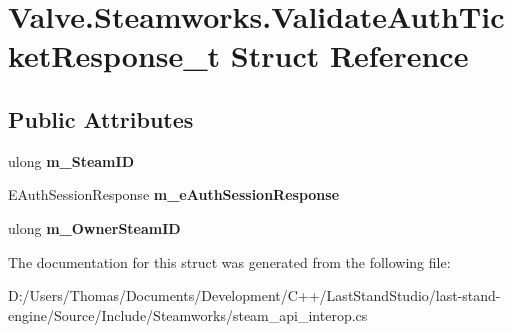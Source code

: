 \hypertarget{structValve_1_1Steamworks_1_1ValidateAuthTicketResponse__t}{}\section{Valve.\+Steamworks.\+Validate\+Auth\+Ticket\+Response\+\_\+t Struct Reference}
\label{structValve_1_1Steamworks_1_1ValidateAuthTicketResponse__t}
\subsection*{Public Attributes}
\begin{DoxyCompactItemize}
\item 
\hypertarget{structValve_1_1Steamworks_1_1ValidateAuthTicketResponse__t_abddacfbeab9643cce489669a480bddae}{}ulong {\bfseries m\+\_\+\+Steam\+I\+D}\label{structValve_1_1Steamworks_1_1ValidateAuthTicketResponse__t_abddacfbeab9643cce489669a480bddae}

\item 
\hypertarget{structValve_1_1Steamworks_1_1ValidateAuthTicketResponse__t_a4cf0a0c6482bbe28261665b1f562ff1a}{}E\+Auth\+Session\+Response {\bfseries m\+\_\+e\+Auth\+Session\+Response}\label{structValve_1_1Steamworks_1_1ValidateAuthTicketResponse__t_a4cf0a0c6482bbe28261665b1f562ff1a}

\item 
\hypertarget{structValve_1_1Steamworks_1_1ValidateAuthTicketResponse__t_a9b8b443f1f3078b711774bccf35c1456}{}ulong {\bfseries m\+\_\+\+Owner\+Steam\+I\+D}\label{structValve_1_1Steamworks_1_1ValidateAuthTicketResponse__t_a9b8b443f1f3078b711774bccf35c1456}

\end{DoxyCompactItemize}


The documentation for this struct was generated from the following file\+:\begin{DoxyCompactItemize}
\item 
D\+:/\+Users/\+Thomas/\+Documents/\+Development/\+C++/\+Last\+Stand\+Studio/last-\/stand-\/engine/\+Source/\+Include/\+Steamworks/steam\+\_\+api\+\_\+interop.\+cs\end{DoxyCompactItemize}

